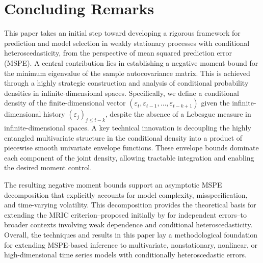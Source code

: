 \documentclass[ejsv2]{imsart}
\theoremstyle{plain}
\theoremstyle{definition}
\theoremstyle{remark}
\begin{document}
\section{Concluding Remarks}
This paper takes an initial step toward developing a rigorous framework for prediction and model selection in weakly stationary processes with conditional heteroscedasticity, from the perspective of mean squared prediction error (MSPE). A central contribution lies in establishing a negative moment bound for the minimum eigenvalue of the sample autocovariance matrix. This is achieved through a highly strategic construction and analysis of conditional probability densities in infinite-dimensional spaces.
Specifically, we define a conditional density of the finite-dimensional vector 
$(\varepsilon_t,\varepsilon_{t-1},\ldots,\varepsilon_{t-k+1})$ given 
the infinite-dimensional history
$(\varepsilon_{j})_{j\leq t-k}$,
despite the absence of a Lebesgue measure in infinite-dimensional spaces. 
A key technical innovation is decoupling the highly entangled multivariate structure in the conditional density into a product of piecewise smooth univariate envelope functions.
These envelope bounds dominate each component of the joint density, allowing tractable integration and enabling the desired moment control.


The resulting negative moment bounds support an asymptotic MSPE decomposition that explicitly accounts for model complexity, misspecification, and time-varying volatility. This decomposition provides the theoretical basis for extending the MRIC criterion--proposed initially by
\cite{Hsu2019} for independent errors--to broader contexts involving weak dependence and conditional heteroscedasticity. 
Overall, the techniques and results in this paper lay a methodological foundation for extending MSPE-based inference to multivariate, nonstationary, nonlinear, or high-dimensional time series models with conditionally heteroscedastic errors.
\end{document}
